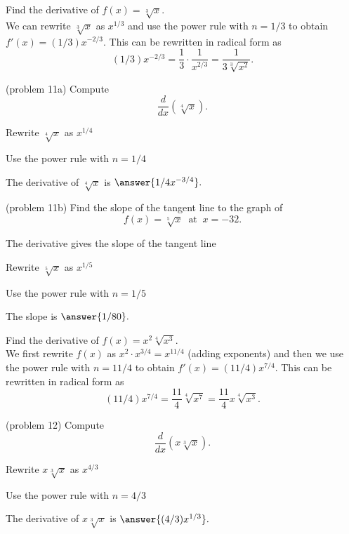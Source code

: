 \documentclass[handout]{ximera}
\begin{document}
\begin{example}[example 11]
Find the derivative of $f(x) = \sqrt[3] x$.\\
We can rewrite $\sqrt[3] x$ as $x^{1/3}$ and use the power rule with $n = 1/3$ to obtain
$f'(x) = (1/3)x^{-2/3}$.  This can be rewritten in radical form as 
\[(1/3)x^{-2/3} = \frac{1}{3}\cdot \frac{1}{x^{2/3}} = \frac{1}{3\sqrt[3] {x^2}}.\]
\end{example}




\begin{problem}(problem 11a)
Compute
\[
\frac{d}{dx} \left(\sqrt[4] x\right).
\]
\begin{hint}
Rewrite $\sqrt[4] x$ as $x^{1/4}$
\end{hint}
\begin{hint}
Use the power rule with $n = 1/4$
\end{hint}
The derivative of $\sqrt[4] x$ is $\answer{1/4 x^{-3/4}}.$
\end{problem}



\begin{problem}(problem 11b)
Find the slope of the tangent line to the graph of 
\[
f(x) = \sqrt[5] x  \;\; \text{at} \;\; x = -32.
\]

\begin{hint}
The derivative gives the slope of the tangent line
\end{hint}
\begin{hint}
Rewrite $\sqrt[5] x$ as $x^{1/5}$
\end{hint}
\begin{hint}
Use the power rule with $n = 1/5$
\end{hint}
The slope is  $\answer{1/80}.$
\end{problem}



\begin{example}[example 12]
Find the derivative of $f(x) = x^2\sqrt[4] {x^3}$.\\
We first rewrite $f(x)$ 
as $x^2 \cdot x^{3/4} = x^{11/4}$ (adding exponents) and then we use the power rule with $n = 11/4$
to obtain $f'(x) = (11/4)x^{7/4}$. This can be rewritten in radical form as 
\[(11/4)x^{7/4}  = \frac{11}{4} \sqrt[4] {x^7} = \frac{11}{4} x\sqrt[4] {x^3} .\]
\end{example}



\begin{problem}(problem 12)
Compute
\[
\frac{d}{dx} \left(x\sqrt[3] x\right).
\]
\begin{hint}
Rewrite $x\sqrt[3] x$ as $x^{4/3}$
\end{hint}
\begin{hint}
Use the power rule with $n = 4/3$
\end{hint}
The derivative of $x\sqrt[3] x$ is $\answer{(4/3) x^{1/3}}.$
\end{problem}
\end{document}
